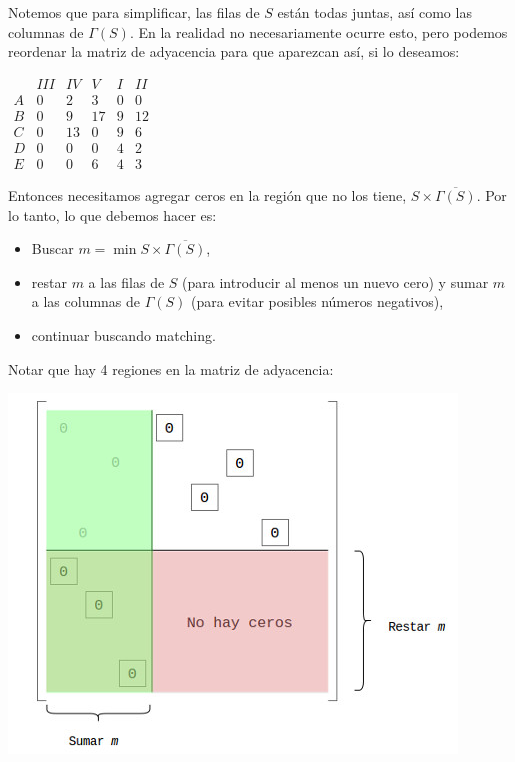 \documentclass[10pt,a4paper]{article}
\begin{document}
Notemos que para simplificar, las filas de $S$ están todas juntas, así como las columnas de $\Gamma(S)$. En la realidad no necesariamente ocurre esto, pero podemos reordenar la matriz de adyacencia para que aparezcan así, si lo deseamos:

\begin{center}
$\begin{array}{cccc|cc} & III & IV & V& I & II \\ A & 0 & 2 & 3& \boxed{0} & 0 \\ \hline B & \boxed{0} & 9 & 17 & 9 & 12 \\ C & 0 & 13 & \boxed{0}& 9 & 6 \\ D & 0 & \boxed{0} & 0& 4 & 2 \\ E & 0 & 0 & 6& 4 & 3 \end{array}$
\end{center}

Entonces necesitamos agregar ceros en la región que no los tiene, $S \times \overline{\Gamma(S)}$. Por lo tanto, lo que debemos hacer es:

\begin{itemize}

	\item Buscar $m = \min{S \times \overline{\Gamma (S)}}$,
	\item restar $m $ a las filas de $S$ (para introducir al menos un nuevo cero) y sumar $m$ a las columnas de $\Gamma(S)$ (para evitar posibles números negativos),
	\item continuar buscando matching.
\end{itemize}

Notar que hay 4 regiones en la matriz de adyacencia:

\begin{center}

    \begin{adjustbox}{max size={\textwidth}{\textheight}}
        \includegraphics{definitions/matching_17.jpg}
        \end{adjustbox}
    
\end{center}
\end{document}
